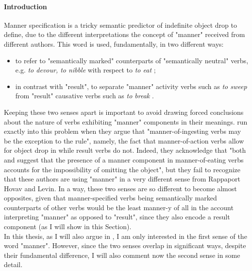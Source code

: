 \paragraph{Introduction}
Manner specification is a tricky semantic predictor of indefinite object drop to define, due to the different interpretations the concept of "manner" received from different authors. This word is used, fundamentally, in two different ways:
\begin{itemize}
    \item to refer to "semantically marked" counterparts of "semantically neutral" verbs, e.g. \textit{to devour, to nibble} with respect to \textit{to eat} \parencite{Naess2007, FellbaumKegl1989taxonomic, Rice1988};
    \item in contrast with "result", to separate "manner" activity verbs such as \textit{to sweep} from "result" causative verbs such as \textit{to break} \parencite{BeaversKoontzGarboden2012, BeaversKoontzGarboden2017, Beavers2013, RappaportLevin1998building, RappaportHovavLevin2005, LevinRappaportHovav2008, RappaportHovavLevin2010, Melchin2019}.
\end{itemize}

Keeping these two senses apart is important to avoid drawing forced conclusions about the nature of verbs exhibiting "manner" components in their meanings. \textcite[7]{Garcia-VelascoMunoz2002} run exactly into this problem when they argue that "manner-of-ingesting verbs may be the exception to the rule", namely, the fact that manner-of-action verbs allow for object drop in \textcite{RappaportLevin1998building} while result verbs do not. Indeed, they acknowledge that "both \textcite{Rice1988} and \textcite{FellbaumKegl1989taxonomic} suggest that the presence of a manner component in manner-of-eating verbs accounts for the impossibility of omitting the object", but they fail to recognize that these authors are using "manner" in a very different sense from Rappaport Hovav and Levin. In a way, these two senses are so different to become almost opposites, given that manner-specified verbs being semantically marked counterparts of other verbs would be the least manner-y of all in the account interpreting "manner" as opposed to "result", since they also encode a result component (as I will show in this Section).\\ %
In this thesis, as I will also argue in , I am only interested in the first sense of the word "manner". However, since the two senses overlap in significant ways, despite their fundamental difference, I will also comment now the second sense in some detail.

